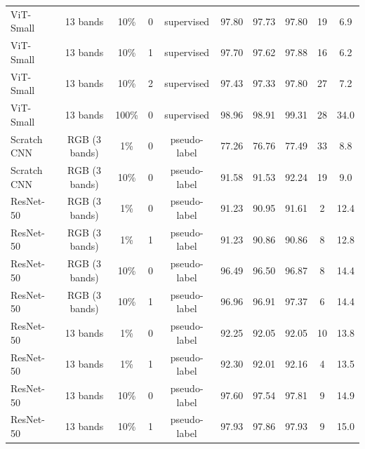 \begin{table}[t]
\begin{tabular}{lccccccccc}
ViT-Small & 13 bands & 10\% & 0 & supervised & 97.80 & 97.73 & 97.80 & 19 & 6.9 \\
ViT-Small & 13 bands & 10\% & 1 & supervised & 97.70 & 97.62 & 97.88 & 16 & 6.2 \\
ViT-Small & 13 bands & 10\% & 2 & supervised & 97.43 & 97.33 & 97.80 & 27 & 7.2 \\
ViT-Small & 13 bands & 100\% & 0 & supervised & 98.96 & 98.91 & 99.31 & 28 & 34.0 \\
Scratch CNN & RGB (3 bands) & 1\% & 0 & pseudo-label & 77.26 & 76.76 & 77.49 & 33 & 8.8 \\
Scratch CNN & RGB (3 bands) & 10\% & 0 & pseudo-label & 91.58 & 91.53 & 92.24 & 19 & 9.0 \\
ResNet-50 & RGB (3 bands) & 1\% & 0 & pseudo-label & 91.23 & 90.95 & 91.61 & 2 & 12.4 \\
ResNet-50 & RGB (3 bands) & 1\% & 1 & pseudo-label & 91.23 & 90.86 & 90.86 & 8 & 12.8 \\
ResNet-50 & RGB (3 bands) & 10\% & 0 & pseudo-label & 96.49 & 96.50 & 96.87 & 8 & 14.4 \\
ResNet-50 & RGB (3 bands) & 10\% & 1 & pseudo-label & 96.96 & 96.91 & 97.37 & 6 & 14.4 \\
ResNet-50 & 13 bands & 1\% & 0 & pseudo-label & 92.25 & 92.05 & 92.05 & 10 & 13.8 \\
ResNet-50 & 13 bands & 1\% & 1 & pseudo-label & 92.30 & 92.01 & 92.16 & 4 & 13.5 \\
ResNet-50 & 13 bands & 10\% & 0 & pseudo-label & 97.60 & 97.54 & 97.81 & 9 & 14.9 \\
ResNet-50 & 13 bands & 10\% & 1 & pseudo-label & 97.93 & 97.86 & 97.93 & 9 & 15.0 \\
\bottomrule
\end{tabular}
\end{table}
